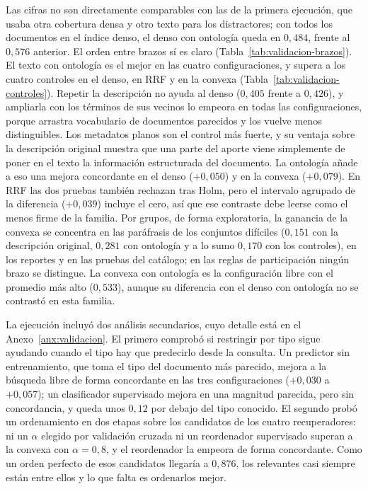 \documentclass[11pt,letterpaper]{article}
\numberwithin{equation}{section}
\begin{document}
Las cifras no son directamente comparables con las de la primera ejecución, que usaba otra cobertura densa y otro texto para los distractores; con todos los documentos en el índice denso, el denso con ontología queda en $0{,}484$, frente al $0{,}576$ anterior. El orden entre brazos sí es claro (Tabla~\ref{tab:validacion-brazos}). El texto con ontología es el mejor en las cuatro configuraciones, y supera a los cuatro controles en el denso, en RRF y en la convexa (Tabla~\ref{tab:validacion-controles}). Repetir la descripción no ayuda al denso ($0{,}405$ frente a $0{,}426$), y ampliarla con los términos de sus vecinos lo empeora en todas las configuraciones, porque arrastra vocabulario de documentos parecidos y los vuelve menos distinguibles. Los metadatos planos son el control más fuerte, y su ventaja sobre la descripción original muestra que una parte del aporte viene simplemente de poner en el texto la información estructurada del documento. La ontología añade a eso una mejora concordante en el denso ($+0{,}050$) y en la convexa ($+0{,}079$). En RRF las dos pruebas también rechazan tras Holm, pero el intervalo agrupado de la diferencia ($+0{,}039$) incluye el cero, así que ese contraste debe leerse como el menos firme de la familia. Por grupos, de forma exploratoria, la ganancia de la convexa se concentra en las paráfrasis de los conjuntos difíciles ($0{,}151$ con la descripción original, $0{,}281$ con ontología y a lo sumo $0{,}170$ con los controles), en los reportes y en las pruebas del catálogo; en las reglas de participación ningún brazo se distingue. La convexa con ontología es la configuración libre con el promedio más alto ($0{,}533$), aunque su diferencia con el denso con ontología no se contrastó en esta familia.

La ejecución incluyó dos análisis secundarios, cuyo detalle está en el Anexo~\ref{anx:validacion}. El primero comprobó si restringir por tipo sigue ayudando cuando el tipo hay que predecirlo desde la consulta. Un predictor sin entrenamiento, que toma el tipo del documento más parecido, mejora a la búsqueda libre de forma concordante en las tres configuraciones ($+0{,}030$ a $+0{,}057$); un clasificador supervisado mejora en una magnitud parecida, pero sin concordancia, y queda unos $0{,}12$ por debajo del tipo conocido. El segundo probó un ordenamiento en dos etapas sobre los candidatos de los cuatro recuperadores: ni un $\alpha$ elegido por validación cruzada ni un reordenador supervisado superan a la convexa con $\alpha=0{,}8$, y el reordenador la empeora de forma concordante. Como un orden perfecto de esos candidatos llegaría a $0{,}876$, los relevantes casi siempre están entre ellos y lo que falta es ordenarlos mejor.
\end{document}
